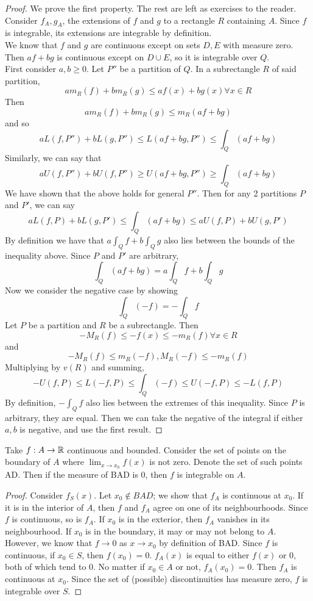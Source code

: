 \documentclass[12pt]{article}
\begin{document}
\begin{proof}
    We prove the first property. The rest are left as exercises to the reader. Consider $f_A, g_A$, the extensions of $f$ and $g$ to a rectangle $R$ containing $A$. Since $f$ is integrable, its extensions are integrable by definition. \\
    We know that $f$ and $g$ are continuous except on sets $D,E$ with measure zero. Then $af + bg$ is continuous except on $D \cup E$, so it is integrable over $Q$. \\
    First consider $a,b \geq 0$. Let $P''$ be a partition of $Q$. In a subrectangle $R$ of said partition,
    $$am_R(f) + bm_R(g) \leq af(x) + bg(x) \forall x \in R$$
    Then
    $$a m_R(f) + bm_R(g) \leq m_R(af + bg)$$
    and so
    $$aL(f,P'') + bL(g,P'') \leq L(af+bg,P'') \leq \int_Q (af+bg)$$
    Similarly, we can say that
    $$aU(f,P'') + bU(f,P'') \geq U(af + bg,P'') \geq \int_Q (af+bg)$$
    We have shown that the above holds for general $P''$. Then for any 2 partitions $P$ and $P'$, we can say
    $$aL(f,P) + bL(g,P') \leq \int_Q (af + bg) \leq aU(f,P) + bU(g,P')$$
    By definition we have that $a\int_Q f + b\int_Q g$ also lies between the bounds of the inequality above. Since $P$ and $P'$ are arbitrary,
    $$\int_Q(af + bg) = a\int_Q f + b\int_Q g$$
    Now we consider the negative case by showing
    $$\int_Q (-f) = -\int_Q f$$
    Let $P$ be a partition and $R$ be a subrectangle. Then
    $$-M_R(f) \leq -f(x) \leq -m_R(f) \forall x \in R$$
    and
    $$-M_R(f) \leq m_R(-f), M_R(-f) \leq -m_R(f)$$
    Multiplying by $v(R)$ and summing,
    $$-U(f,P) \leq L(-f, P) \leq \int_Q (-f) \leq U(-f, P) \leq -L(f,P)$$
    By definition, $-\int_Q f$ also lies between the extremes of this inequality. Since $P$ is arbitrary, they are equal. Then we can take the negative of the integral if either $a,b$ is negative, and use the first result.
\end{proof}

\begin{thm}
    Take $f:A \rightarrow \mathbb{R}$ continuous and bounded. Consider the set of points on the boundary of $A$ where $\lim_{x\rightarrow x_0} f(x)$ is not zero. Denote the set of such points AD. Then if the measure of BAD is 0, then $f$ is integrable on $A$.
\end{thm}

\begin{proof}
    Consider $f_S(x)$. Let $x_0 \notin BAD$; we show that $f_A$ is continuous at $x_0$. If it is in the interior of $A$, then $f$ and $f_A$ agree on one of its neighbourhoods. Since $f$ is continuous, so is $f_A$. If $x_0$ is in the exterior, then $f_A$ vanishes in its neighbourhood. If $x_0$ is in the boundary, it may or may not belong to $A$. However, we know that $f \rightarrow 0$ as $x \rightarrow x_0$ by definition of BAD. Since $f$ is continuous, if $x_0 \in S$, then $f(x_0) = 0$. $f_A(x)$ is equal to either $f(x)$ or 0, both of which tend to 0. No matter if $x_0 \in A$ or not, $f_A(x_0) = 0$. Then $f_A$ is continuous at $x_0$. Since the set of (possible) discontinuities has measure zero, $f$ is integrable over $S$.
\end{proof}
\end{document}
